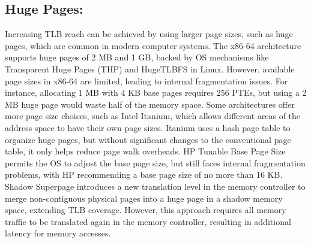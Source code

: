 \subsection{Huge Pages:}
Increasing TLB reach can be achieved by using larger page sizes, such as huge pages, which are common in modern computer systems. 
The x86-64 architecture supports huge pages of 2 MB and 1 GB, backed by OS mechanisms like Transparent Huge Pages (THP) 
and HugeTLBFS in Linux. However, available page sizes in x86-64 are limited, leading to internal fragmentation issues. 
For instance, allocating 1 MB with 4 KB base pages requires 256 PTEs, but using a 2 MB huge page would waste 
half of the memory space. Some architectures offer more page size choices, such as Intel Itanium, which 
allows different areas of the address space to have their own page sizes. Itanium uses a hash page table to organize huge 
pages, but without significant changes to the conventional page table, it only helps reduce page walk overheads. 
HP Tunable Base Page Size permits the OS to adjust the base page size, but still faces internal fragmentation problems, 
with HP recommending a base page size of no more than 16 KB. Shadow Superpage introduces a new translation level 
in the memory controller to merge non-contiguous physical pages into a huge page in a shadow memory space, extending 
TLB coverage. However, this approach requires all memory traffic to be translated again in the memory controller, 
resulting in additional latency for memory accesses.



